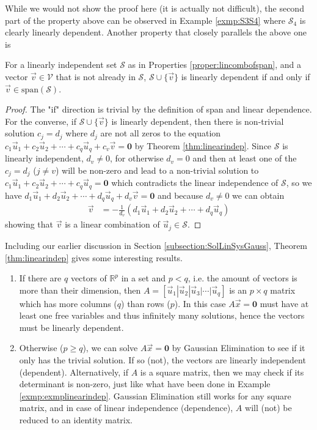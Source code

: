 While we would not show the proof here (it is actually not difficult), the second part of the property above can be observed in Example \ref{exmp:S3S4} where $\mathcal{S}_4$ is clearly linearly dependent. Another property that closely parallels the above one is
\begin{proper}
\label{proper:addvdepend}
For a linearly independent set $\mathcal{S}$ as in Properties \ref{proper:lincombofspan}, and a vector $\vec{v} \in \mathcal{V}$ that is not already in $\mathcal{S}$, $\mathcal{S} \cup \{\vec{v}\}$ is linearly dependent if and only if $\vec{v} \in \text{span}(\mathcal{S})$.
\end{proper}
\begin{proof}
The "if" direction is trivial by the definition of span and linear dependence. For the converse, if $\mathcal{S} \cup \{\vec{v}\}$ is linearly dependent, then there is non-trivial solution $c_j = d_j$ where $d_j$ are not all zeros to the equation $c_1\vec{u}_1 + c_2\vec{u}_2 + \cdots + c_q\vec{u}_q + c_v\vec{v} = \textbf{0}$ by Theorem \ref{thm:linearindep}. Since $\mathcal{S}$ is linearly independent, $d_v \neq 0$, for otherwise $d_v = 0$ and then at least one of the $c_j = d_j$ ($j \neq v$) will be non-zero and lead to a non-trivial solution to $c_1\vec{u}_1 + c_2\vec{u}_2 + \cdots + c_q\vec{u}_q = \textbf{0}$ which contradicts the linear independence of $\mathcal{S}$, so we have $d_1\vec{u}_1 + d_2\vec{u}_2 + \cdots + d_q\vec{u}_q + d_v\vec{v} = \textbf{0}$ and because $d_v \neq 0$ we can obtain
\begin{align*}
\vec{v} &= -\frac{1}{d_v}(d_1\vec{u}_1 + d_2\vec{u}_2 + \cdots + d_q\vec{u}_q)
\end{align*}
showing that $\vec{v}$ is a linear combination of $\vec{u}_j \in \mathcal{S}$.
\end{proof}
Including our earlier discussion in Section \ref{subsection:SolLinSysGauss}, Theorem \ref{thm:linearindep} gives some interesting results.
\begin{enumerate}
\item If there are $q$ vectors of $\mathbb{R}^p$ in a set and $p < q$, i.e. the amount of vectors is more than their dimension, then $A = [\vec{u}_1|\vec{u}_2|\vec{u}_3|\cdots|\vec{u}_q]$ is an $p \times q$ matrix which has more columns ($q$) than rows ($p$). In this case $A\vec{x} = \textbf{0}$ must have at least one free variables and thus infinitely many solutions, hence the vectors must be linearly dependent.
\item Otherwise ($p \geq q$), we can solve $A\vec{x} = \textbf{0}$ by Gaussian Elimination to see if it only has the trivial solution. If so (not), the vectors are linearly independent (dependent). Alternatively, if $A$ is a square matrix, then we may check if its determinant is non-zero, just like what have been done in Example \ref{exmp:exmplinearindep}. Gaussian Elimination still works for any square matrix, and in case of linear independence (dependence), $A$ will (not) be reduced to an identity matrix.
\end{enumerate}
